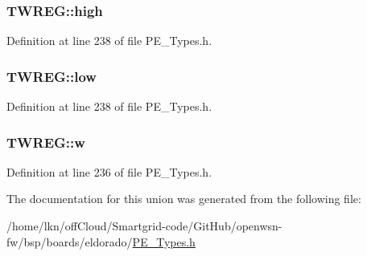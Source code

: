 \subsubsection[{\texorpdfstring{high}{high}}]{ T\+W\+R\+E\+G\+::high}\hypertarget{union_t_w_r_e_g_a60da206916b4a23cd33571bf37e66af8}{}\label{union_t_w_r_e_g_a60da206916b4a23cd33571bf37e66af8}


Definition at line 238 of file P\+E\+\_\+\+Types.\+h.

\subsubsection[{\texorpdfstring{low}{low}}]{ T\+W\+R\+E\+G\+::low}\hypertarget{union_t_w_r_e_g_a0ed527e62a851c56d0596429ad250718}{}\label{union_t_w_r_e_g_a0ed527e62a851c56d0596429ad250718}


Definition at line 238 of file P\+E\+\_\+\+Types.\+h.

\subsubsection[{\texorpdfstring{w}{w}}]{ T\+W\+R\+E\+G\+::w}\hypertarget{union_t_w_r_e_g_af5cb5460f8cfc067454f6acec1ba04ac}{}\label{union_t_w_r_e_g_af5cb5460f8cfc067454f6acec1ba04ac}


Definition at line 236 of file P\+E\+\_\+\+Types.\+h.



The documentation for this union was generated from the following file\+:\begin{DoxyCompactItemize}
\item 
/home/lkn/off\+Cloud/\+Smartgrid-\/code/\+Git\+Hub/openwsn-\/fw/bsp/boards/eldorado/\hyperlink{_p_e___types_8h}{P\+E\+\_\+\+Types.\+h}\end{DoxyCompactItemize}
